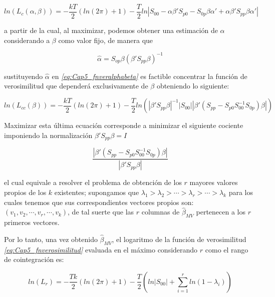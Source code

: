  \begin{equation} \label{eq:Cap5_fnveralphabeta}
 ln(L_c(\alpha,\beta))= -\frac{kT}{2}(ln(2\pi)+1)-\frac{T}{2}ln\left | S_{00}-\alpha \beta' S_{p0} -S_{0p}\beta \alpha' + \alpha\beta'S_{pp}\beta\alpha' \right |
 \end{equation}
  
 a partir de la cual, al maximizar,  podemos obtener una estimación de $\alpha$ considerando a $\beta$ como valor fijo, de manera que 
 
 \begin{equation}
 \widehat{\alpha}= S_{op}\beta(\beta'S_{pp}\beta)^{-1}
 \end{equation} 
 
 sustituyendo $\widehat{\alpha}$ en \textit{\ref{eq:Cap5_fnveralphabeta}} es factible concentrar la función de verosimilitud que dependerá exclusivamente de $\beta$ obteniendo lo siguiente:
 
 \begin{equation}
 ln(L_{cc}(\beta))= -\frac{kT}{2}(ln(2\pi)+1)-\frac{T}{2}ln\left ( \left | \beta'S_{pp}\beta \right |^{-1} \left | S_{00} \right |\left | \beta'\left ( S_{pp}-S_{p0}S_{00}^{-1}S_{0p} \right )\beta \right | \right )
 \end{equation}
 
 Maximizar esta última ecuación corresponde a minimizar el siguiente cociente imponiendo la normalización $ \beta'S_{pp}\beta=I$
  
\begin{equation}\label{eq:Cap5_maximover}
\frac{\left | \beta'\left ( S_{pp}-S_{p0}S_{00}^{-1}S_{0p} \right )\beta \right |}{\left | \beta'S_{pp}\beta \right |}
\end{equation}

el cual equivale a resolver el problema de obtención de los $r$ mayores valores propios de los  $k$ existentes; supongamos que $\lambda_1>\lambda_2>\cdots>\lambda_r>\cdots>\lambda_k$ para los cuales tenemos que sus correspondientes vectores propios son: $(v_1,v_2,\cdots, v_r, \cdots, v_k)$, de tal suerte que las $r$ columnas de $\widehat{\beta}_{MV}$ pertenecen a los $r$ primeros vectores.\bigskip 

Por lo tanto, una vez obtenido $\widehat{\beta}_{MV}$, el logaritmo de la  función de verosimilitud \textit{\ref{eq:Cap5_fnverosimilitud}} evaluada en el máximo considerando $r$ como el rango de cointegración  es:

\begin{equation} \label{eq:Cap5_maximofnver}
ln(L_r)=-\frac{Tk}{2}\left ( ln(2\pi)+1 \right )-\frac{T}{2}\left ( ln\left | S_{00} \right |+ \sum_{i=1}^rln(1-\lambda_i) \right )
\end{equation}


